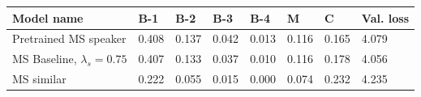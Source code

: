 \begin{table}[]
	\begin{tabularx}{\textwidth}{|X|l|l|l|l|l|l|l|}
		\hline
		\textbf{Model name}                                    & \textbf{B-1} & \textbf{B-2} & \textbf{B-3} & \textbf{B-4} & \textbf{M} & \textbf{C} & \textbf{Val. loss} \\ \hline
		Pretrained MS speaker                             & 0.408           & 0.137           & 0.042           & 0.013           & 0.116           & 0.165          & 4.079                    \\ \hline
		MS Baseline, $\lambda_s = 0.75$   & 0.407           & 0.133           & 0.037           & 0.010           & 0.116           & 0.178          & 4.056                    \\ \hline
		MS similar  &     0.222    &          0.055       &       0.015         &        0.000         &   0.074              &      0.232         &      4.235                    \\ \hline

\end{tabularx}
\end{table}
